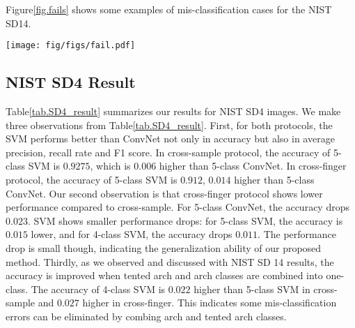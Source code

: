 Figure\ref{fig.fails} shows some examples of mis-classification cases for the NIST SD14.
%

\begin{figure*}[!ht]
	\begin{center}
		\texttt{[image: fig/figs/fail.pdf]}
	\end{center}
	\caption{Examples of mis-classification cases for NIST SD14. Each example is labeled with \textit{Prediction}(\textit{Ground Truth})} 
	\label{fig.fails}
\end{figure*}
\subsection{NIST SD4 Result}
\label{sec_sd4}
 Table\ref{tab.SD4_result} summarizes our results for NIST SD4 images.
%
We make three observations from Table\ref{tab.SD4_result}.
%
First, for both protocols, the SVM performs better than ConvNet not only in accuracy but also in average precision, recall rate and F1 score. 
%
In cross-sample protocol, the accuracy of 5-class SVM is $0.9275$, which is $0.006$ higher than 5-class ConvNet. In cross-finger protocol, the accuracy of 5-class SVM is $0.912$, $0.014$ higher than 5-class ConvNet.
%
Our second observation is that cross-finger protocol shows lower performance compared to cross-sample. For 5-class ConvNet, the accuracy drops $0.023$. SVM shows smaller performance drops: for 5-class SVM, the accuracy is $0.015$ lower, and for 4-class SVM, the accuracy drops $0.011$. 
%
%
The performance drop is small though, indicating the generalization ability of our proposed method.
%
Thirdly, as we observed and discussed with NIST SD 14 results, the accuracy is improved when tented arch and arch classes are combined into one-class. The accuracy of 4-class SVM is $0.022$ higher than 5-class SVM in cross-sample and $0.027$ higher in cross-finger. This indicates some mis-classification errors can be eliminated by combing arch and tented arch classes.

